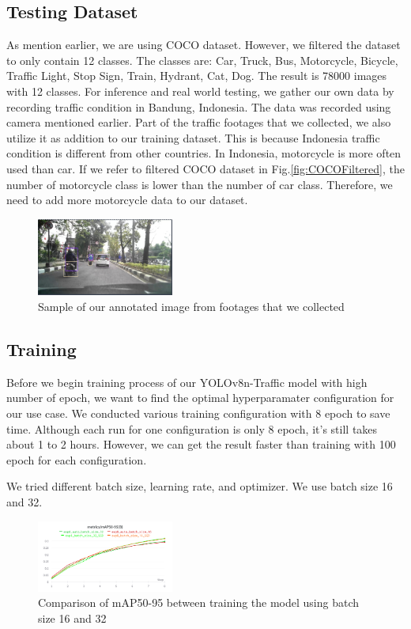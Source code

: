 \documentclass[conference]{IEEEtran}
\begin{document}
\subsection{Testing Dataset}
As mention earlier, we are using COCO dataset. However, we filtered the dataset to only contain 12 classes. The classes are:
Car, Truck, Bus, Motorcycle, Bicycle, Traffic Light, Stop Sign, Train, Hydrant, Cat, Dog. The result is 78000 images with 12 classes.
For inference and real world testing, we gather our own data by recording traffic condition in Bandung, Indonesia. The data was recorded using camera mentioned earlier.
Part of the traffic footages that we collected, we also utilize it as addition to our training dataset. This is because Indonesia traffic condition is different from other countries. In Indonesia, motorcycle is more often used than car.
If we refer to filtered COCO dataset in Fig.\ref{fig:COCOFiltered}, the number of motorcycle class is lower than the number of car class. Therefore, we need to add more motorcycle data to our dataset.
\begin{figure}[h]
\centering
\includegraphics[width=0.4\textwidth,keepaspectratio]{sample_dataset.png}
\caption{Sample of our annotated image from footages that we collected}
\end{figure}

\subsection{Training}
Before we begin training process of our YOLOv8n-Traffic model with high number of epoch, we want to find the optimal hyperparamater configuration for our use case. We conducted various training configuration with 8 epoch to save time.
Although each run for one configuration is only 8 epoch, it's still takes about 1 to 2 hours. However, we can get the result faster than training with 100 epoch for each configuration.

We tried different batch size, learning rate, and optimizer. We use batch size 16 and 32.
\begin{figure}[h]
\centering
\includegraphics[width=0.4\textwidth,keepaspectratio]{mAP_batch_size_comparison.png} %
\caption{Comparison of mAP50-95 between training the model using batch size 16 and 32}
\label{fig:batch_size}
\end{figure}
\end{document}

